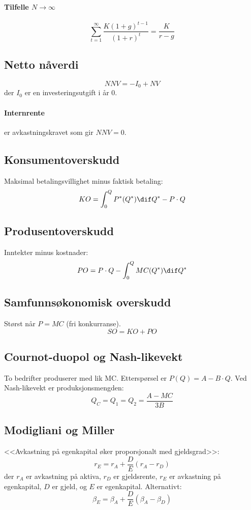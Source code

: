 \documentclass[a4paper]{article}
\begin{document}
\paragraph{Tilfelle $N \rightarrow \infty$} $$\sum_{t=1}^{\infty} \frac{K (1+g)^{t-1}}{(1+r)^t} = \frac{K}{r-g}$$

\subsection*{Netto nåverdi}
$$NNV = -I_0 + NV$$
der $I_0$ er en investeringsutgift i år 0.

\paragraph{Internrente} er avkastningskravet som gir $NNV = 0$.

\subsection*{Konsumentoverskudd}
Maksimal betalingsvillighet minus faktisk betaling: $$KO = \int_{0}^{Q} P^*(Q^*) \dif Q^* - P \cdot Q$$

\subsection*{Produsentoverskudd}
Inntekter minus kostnader: $$PO = P \cdot Q - \int_{0}^{Q} MC(Q^*) \dif Q^*$$

\subsection*{Samfunnsøkonomisk overskudd}
Størst når $P = MC$ (fri konkurranse).  $$SO = KO + PO$$

\subsection*{Cournot-duopol og Nash-likevekt}
To bedrifter produserer med lik MC. Etterspørsel er $P(Q) = A - B \cdot Q$. Ved Nash-likevekt er produksjonsmengden: $$Q_C = Q_1 = Q_2 = \frac{A-MC}{3B}$$

\subsection*{Modigliani og Miller}
<<Avkastning på egenkapital øker proporsjonalt med gjeldsgrad>>:
$$r_E = r_A + \frac{D}{E}(r_A-r_D)$$
der $r_A$ er avkastning på aktiva, $r_D$ er gjeldsrente, $r_E$ er avkastning på egenkapital, $D$ er gjeld, og $E$ er egenkapital. Alternativt:
$$\beta_E = \beta_A + \frac{D}{E}(\beta_A-\beta_D)$$
\end{document}
